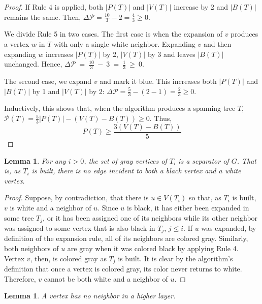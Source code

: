 \documentclass[12pt]{article}
\newtheorem{lemma}[theorem]{Lemma}
\begin{document}
\begin{proof}
  If Rule 4 is applied, both $|P(T)|$ and $|V(T)|$ increase by 2 and $|B(T)|$ remains the same.
  Then, $\Delta \mathcal{P} = \frac{10}{3} - 2 = \frac{4}{3} \ge 0$.

  We divide Rule 5 in two cases.
  The first case is when the expansion of $v$ produces a vertex $w$ in $T$ with only a single white neighbor.
  Expanding $v$ and then expanding $w$ increases $|P(T)|$ by 2, $|V(T)|$ by 3 and leaves $|B(T)|$ unchanged.
  Hence, $\Delta \mathcal{P}~=~\frac{10}{3}~-~3~=~\frac{1}{3}~\ge~0$.

  The second case, we expand $v$ and mark it blue.
  This increases both $|P(T)|$ and $|B(T)|$ by 1 and $|V(T)|$ by 2: $\Delta \mathcal{P} = \frac{5}{3} - (2 - 1) = \frac{2}{3} \ge 0$.

  Inductively, this shows that, when the algorithm produces a spanning tree $T$, $\mathcal{P}(T) = \frac{5}{3}|P(T)| - (V(T) - B(T)) \ge 0$.
  Thus,
  $$ P(T) \ge \frac{3(V(T) - B(T))}{5} $$

\end{proof}

\begin{lemma} \label{lemma:sep}
  For any $i > 0$, the set of gray vertices of $T_i$ is a separator of $G$.
  That is, as $T_i$ is built, there is no edge incident to both a black vertex and a white vertex.
\end{lemma}

\begin{proof}
  Suppose, by contradiction, that there is $u \in V(T_i)$ so that, as $T_i$ is built, $v$ is white and a neighbor of $u$.
  Since $u$ is black, it has either been expanded in some tree $T_j$, or it has been assigned one of its neighbors while its other neighbor was assigned to some vertex that is also black in $T_j$, $j \le i$.
  If $u$ was expanded, by definition of the expansion rule, all of its neighbors are colored gray.
  Similarly, both neighbors of $u$ are gray when it was colored black by applying Rule 4.
  Vertex $v$, then, is colored gray as $T_j$ is built.
  It is clear by the algorithm's definition that once a vertex is colored gray, its color never returns to white.
  Therefore, $v$ cannot be both white and a neighbor of $u$.
\end{proof}

\begin{lemma}
  A vertex has no neighbor in a higher layer.
\end{lemma}
\end{document}
